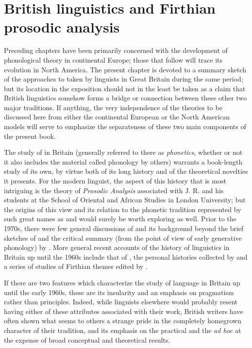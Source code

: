 \chapter{British linguistics and Firthian prosodic analysis}
\label{ch.firth}

Preceding chapters have been primarily concerned with the development
of pho\-nological theory in continental Europe; those that follow will
trace its evolution in North America. The present chapter is devoted
to a summary sketch of the approaches to  taken by
linguists in Great Britain during the same period; but its location in
the exposition should not in the least be taken as a claim that
British linguistics somehow forms a bridge or connection between these
other two major traditions. If anything, the very independence of the
theories to be discussed here from either the continental European or
the North American models will serve to emphasize the separateness of
these two main components of the present book.

The study of  in Britain (generally referred to there
as \emph{phonetics}, whether or not it also includes the material
called phonology by others) warrants a book-length study of its own,
by virtue both of its long history and of the theoretical novelties it
presents. For the modern linguist, the aspect of this history that is
most intriguing is the theory of \emph{Prosodic Analysis} associated
with J. R. {\Firth} and his students at the School of Oriental and
African Studies in London University; but the origins of this view and
its relation to the phonetic tradition represented by such great names
as  and  would surely be worth exploring as
well.  Prior to the 1970s, there were few general discussions of
 and its background beyond the brief sketches of
\citet{robins:prosodic,robins:ling_in_gb} and the critical summary
(from the point of view of early generative phonology) by
\citet{langendoen68:london.school}.  More general recent accounts of
the history of linguistics in Britain up until the 1960s include that
of \citet{matthews99:philsoc}, the personal histories collected by
\citet{brown.law02:lx.in.uk} and a series of studies of Firthian
themes edited by \citet{kelly.plug05:firthian}.

If there are two features which characterize the study of language in
Britain up until the early 1960s, these are its insularity and an
emphasis on pragmatism rather than principles. Indeed, while linguists
elsewhere would probably resent having either of these attributes
associated with their work, British writers have often shown what
seems to others a strange pride in the completely homegrown character
of their tradition, and its emphasis on the practical and the \emph{ad hoc}
at the expense of broad conceptual and theoretical results.

